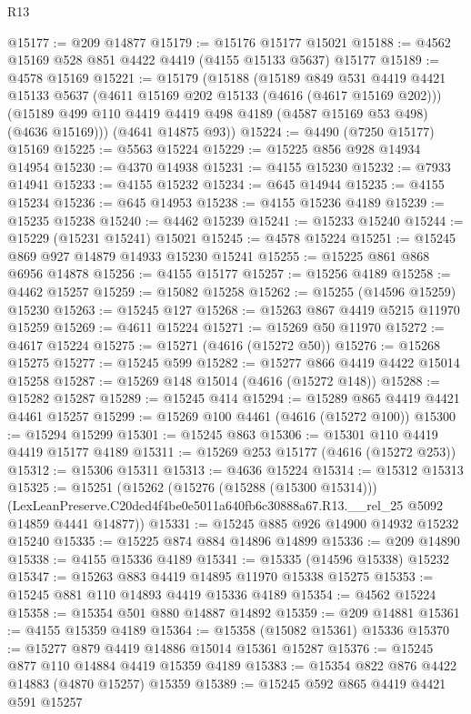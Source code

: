 \begin{lexlean}{R13}
\begin{coremodule}
@15177 := @209 @14877
@15179 := @15176 @15177 @15021
@15188 := @4562 @15169 @528 @851 @4422 @4419 (@4155 @15133 @5637) @15177
@15189 := @4578 @15169
@15221 := @15179
    (@15188
      (@15189
        @849
        @531
        @4419
        @4421
        @15133
        @5637
        (@4611 @15169 @202 @15133 (@4616 (@4617 @15169 @202)))
        (@15189 @499 @110 @4419 @4419 @498 @4189 (@4587 @15169 @53 @498) (@4636 @15169)))
      (@4641 @14875 @93))
@15224 := @4490 (@7250 @15177) @15169
@15225 := @5563 @15224
@15229 := @15225 @856 @928 @14934 @14954
@15230 := @4370 @14938
@15231 := @4155 @15230
@15232 := @7933 @14941
@15233 := @4155 @15232
@15234 := @645 @14944
@15235 := @4155 @15234
@15236 := @645 @14953
@15238 := @4155 @15236 @4189
@15239 := @15235 @15238
@15240 := @4462 @15239
@15241 := @15233 @15240
@15244 := @15229 (@15231 @15241) @15021
@15245 := @4578 @15224
@15251 := @15245 @869 @927 @14879 @14933 @15230 @15241
@15255 := @15225 @861 @868 @6956 @14878
@15256 := @4155 @15177
@15257 := @15256 @4189
@15258 := @4462 @15257
@15259 := @15082 @15258
@15262 := @15255 (@14596 @15259) @15230
@15263 := @15245 @127
@15268 := @15263 @867 @4419 @5215 @11970 @15259
@15269 := @4611 @15224
@15271 := @15269 @50 @11970
@15272 := @4617 @15224
@15275 := @15271 (@4616 (@15272 @50))
@15276 := @15268 @15275
@15277 := @15245 @599
@15282 := @15277 @866 @4419 @4422 @15014 @15258
@15287 := @15269 @148 @15014 (@4616 (@15272 @148))
@15288 := @15282 @15287
@15289 := @15245 @414
@15294 := @15289 @865 @4419 @4421 @4461 @15257
@15299 := @15269 @100 @4461 (@4616 (@15272 @100))
@15300 := @15294 @15299
@15301 := @15245 @863
@15306 := @15301 @110 @4419 @4419 @15177 @4189
@15311 := @15269 @253 @15177 (@4616 (@15272 @253))
@15312 := @15306 @15311
@15313 := @4636 @15224
@15314 := @15312 @15313
@15325 := @15251
    (@15262
      (@15276 (@15288 (@15300 @15314)))
      (LexLeanPreserve.C20ded4f4be0e5011a640fb6c30888a67.R13.__rel_25 @5092 @14859 @4441 @14877))
@15331 := @15245 @885 @926 @14900 @14932 @15232 @15240
@15335 := @15225 @874 @884 @14896 @14899
@15336 := @209 @14890
@15338 := @4155 @15336 @4189
@15341 := @15335 (@14596 @15338) @15232
@15347 := @15263 @883 @4419 @14895 @11970 @15338 @15275
@15353 := @15245 @881 @110 @14893 @4419 @15336 @4189
@15354 := @4562 @15224
@15358 := @15354 @501 @880 @14887 @14892
@15359 := @209 @14881
@15361 := @4155 @15359 @4189
@15364 := @15358 (@15082 @15361) @15336
@15370 := @15277 @879 @4419 @14886 @15014 @15361 @15287
@15376 := @15245 @877 @110 @14884 @4419 @15359 @4189
@15383 := @15354 @822 @876 @4422 @14883 (@4870 @15257) @15359
@15389 := @15245 @592 @865 @4419 @4421 @591 @15257

\end{coremodule}
\end{lexlean}
